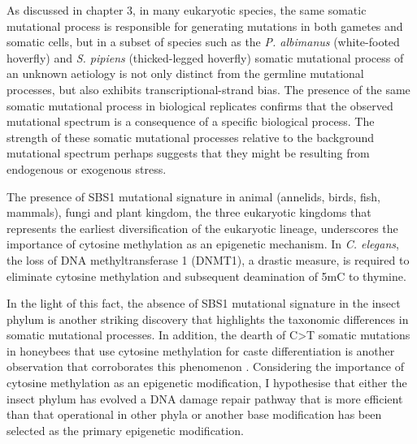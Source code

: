 As discussed in chapter 3, in many eukaryotic species, the same somatic mutational process is responsible for generating mutations in both gametes and somatic cells, but in a subset of species such as the \textit{P. albimanus} (white-footed hoverfly) and \textit{S. pipiens} (thicked-legged hoverfly) somatic mutational process of an unknown aetiology is not only distinct from the germline mutational processes, but also exhibits transcriptional-strand bias. The presence of the same somatic mutational process in biological replicates confirms that the observed mutational spectrum is a consequence of a specific biological process. The strength of these somatic mutational processes relative to the background mutational spectrum perhaps suggests that they might be resulting from endogenous or exogenous stress. 

The presence of SBS1 mutational signature in animal (annelids, birds, fish, mammals), fungi and plant kingdom, the three eukaryotic kingdoms that represents the earliest diversification of the eukaryotic lineage, underscores the importance of cytosine methylation as an epigenetic mechanism. In \textit{C. elegans}, the loss of DNA methyltransferase 1 (DNMT1), a drastic measure, is required to eliminate cytosine methylation and subsequent deamination of 5mC to thymine. 

In the light of this fact, the absence of SBS1 mutational signature in the insect phylum is another striking discovery that highlights the taxonomic differences in somatic mutational processes. In addition, the dearth of C>T somatic mutations in honeybees that use cytosine methylation for caste differentiation is another observation that corroborates this phenomenon \cite{Luo2000-zf}. Considering the importance of cytosine methylation as an epigenetic modification, I hypothesise that either the insect phylum has evolved a DNA damage repair pathway that is more efficient than that operational in other phyla or another base modification has been selected as the primary epigenetic modification. 

